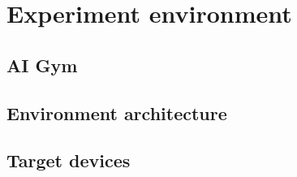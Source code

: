 \FloatBarrier
\chapter{Experiment environment}

\FloatBarrier
\section{AI Gym}

\FloatBarrier
\section{Environment architecture}

\FloatBarrier
\section{Target devices}
